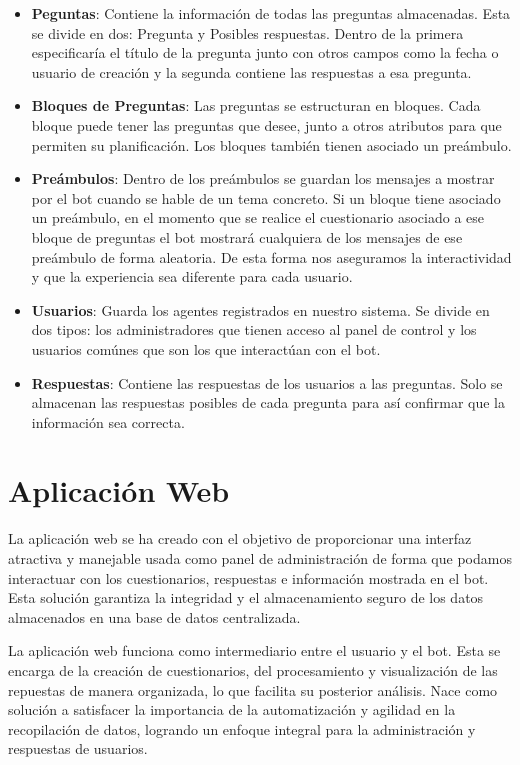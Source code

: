 \begin{itemize}
\item \textbf{Peguntas}: Contiene la información de todas las preguntas almacenadas. Esta se divide en dos: Pregunta y Posibles respuestas. Dentro de la primera especificaría el título de la pregunta junto con otros campos como la fecha o usuario de creación y la segunda contiene las respuestas a esa pregunta. 
\item \textbf{Bloques de Preguntas}: Las preguntas se estructuran en bloques. Cada bloque puede tener las preguntas que desee, junto a otros atributos para que permiten su planificación. Los bloques también tienen asociado un preámbulo. 
\item \textbf{Preámbulos}: Dentro de los preámbulos se guardan los mensajes a mostrar por el bot cuando se hable de un tema concreto. Si un bloque tiene asociado un preámbulo, en el momento que se realice el cuestionario asociado a ese bloque de preguntas el bot mostrará cualquiera de los mensajes de ese preámbulo de forma aleatoria. De esta forma nos aseguramos la interactividad y que la experiencia sea diferente para cada usuario.
\item \textbf{Usuarios}: Guarda los agentes registrados en nuestro sistema. Se divide en dos tipos: los administradores que tienen acceso al panel de control y los usuarios comúnes que son los que interactúan con el bot.
\item \textbf{Respuestas}: Contiene las respuestas de los usuarios a las preguntas. Solo se almacenan las respuestas posibles de cada pregunta para así confirmar que la información sea correcta.
\end{itemize}

\section{Aplicación Web}

La aplicación web se ha creado con el objetivo de proporcionar una interfaz atractiva y manejable usada como panel de administración de forma que podamos interactuar con los cuestionarios, respuestas e información mostrada en el bot. Esta solución garantiza la integridad y el almacenamiento seguro de los datos almacenados en una base de datos centralizada. 

La aplicación web funciona como intermediario entre el usuario y el bot. Esta se encarga de la creación de cuestionarios, del procesamiento y visualización de las repuestas de manera organizada, lo que facilita su posterior análisis. Nace como solución a satisfacer la importancia de la automatización y agilidad en la recopilación de datos, logrando un enfoque integral para la administración y respuestas de usuarios.

